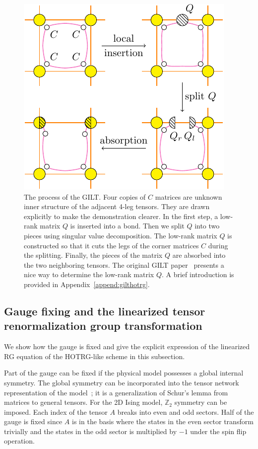 \documentclass[aps,prr,reprint,superscriptaddress,nofootinbib,floatfix]{revtex4-2}
\begin{document}
\begin{figure}[t]
    \includegraphics[scale=0.9,valign=c]{gilt.pdf}
    \caption{\label{fig:gilt}
        The process of the GILT. 
        Four copies of $C$ matrices are unknown inner structure of the adjacent 4-leg tensors.
        They are drawn explicitly to make the demonstration clearer.
        In the first step, a low-rank matrix $Q$ is inserted into a bond. Then we split $Q$ into two pieces using singular value decomposition. 
        The low-rank matrix $Q$ is constructed so that it cuts the legs of the corner matrices $C$ during the splitting. 
        Finally, the pieces of the matrix $Q$ are absorbed into the two neighboring tensors. 
        The original GILT paper~\cite{gilts} presents a nice way to determine the low-rank matrix $Q$.
        A brief introduction is provided in Appendix~\ref{append:gilthotrg}.
    }
\end{figure}
%

\subsection{Gauge fixing and the linearized tensor renormalization group transformation\label{sec:gaugefix}}
We show how the gauge is fixed and give the explicit expression of the linearized RG equation of the HOTRG-like scheme in this subsection.
%

Part of the gauge can be fixed if the physical model possesses a global internal symmetry.
The global symmetry can be incorporated into the tensor network representation of the model~\cite{Singh2010SymTen,Singh2011U1Ten,Singh2012SU2Ten}; it is a generalization of Schur's lemma from matrices to general tensors.
For the 2D Ising model, $\mathbb{Z}_2$ symmetry can be imposed.
Each index of the tensor $A$ breaks into even and odd sectors.
Half of the gauge is fixed since $A$ is in the basis where the states in the even sector transform trivially and
the states in the odd sector is multiplied by $-1$ under the spin flip operation.
%
\end{document}
